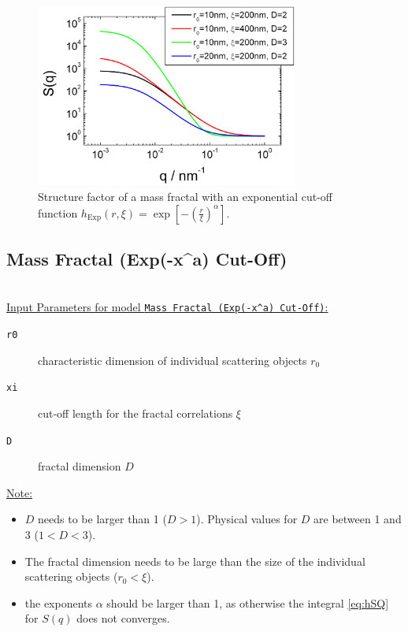 \begin{figure}[htb]
\begin{center}
\includegraphics[width=0.768\textwidth]{../images/structure_factor/MassFractals/SQExpCutOff.png}
\end{center}
\caption{Structure factor of a mass fractal with an exponential
cut-off function $h_\text{Exp}(r,\xi) = \exp\left[-\left(\tfrac{r}{\xi}\right)^\alpha\right]$.}
\label{fig:SQExpCutOff}
\end{figure}


\clearpage
\subsection{Mass Fractal (Exp(-x\^{}a) Cut-Off)}
~\\

\underline{Input Parameters for model \texttt{Mass Fractal (Exp(-x\^{}a) Cut-Off)}:}
\begin{description}
\item[\texttt{r0}] characteristic dimension of individual scattering objects $r_0$
\item[\texttt{xi}] cut-off length for the fractal correlations $\xi$
\item[\texttt{D}] fractal dimension $D$
\end{description}

\underline{Note:}
\begin{itemize}
\item $D$ needs to be larger than 1 ($D>1$). Physical values for $D$ are between 1 and 3 ($1<D<3$).
\item The fractal dimension needs to be large than the size of the individual scattering objects ($r_0 < \xi$).
\item the exponents $\alpha$ should be larger than 1, as otherwise the integral \ref{eq:hSQ} for $S(q)$ does not converges.
\end{itemize}

